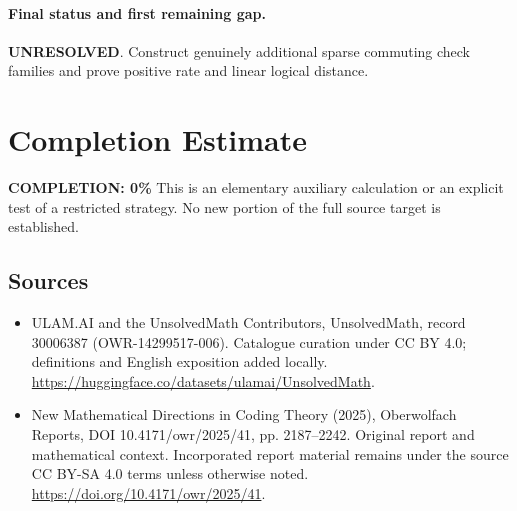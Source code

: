 \documentclass[11pt]{article}
\begin{document}
\paragraph{Final status and first remaining gap.}
\textbf{UNRESOLVED}. Construct genuinely additional sparse commuting check families and prove positive rate and linear logical distance.

\section{Completion Estimate}
\noindent\textbf{COMPLETION: 0\%}
This is an elementary auxiliary calculation or an explicit test of a restricted strategy. No new portion of the full source target is established.

\subsection{Sources}
\begin{itemize}
\item[\hypertarget{source:30006387:1}{S1}] ULAM.AI and the UnsolvedMath Contributors, UnsolvedMath, record 30006387 (OWR-14299517-006). Catalogue curation under CC BY 4.0; definitions and English exposition added locally.
\url{https://huggingface.co/datasets/ulamai/UnsolvedMath}.
\item[\hypertarget{source:30006387:2}{S2}] New Mathematical Directions in Coding Theory (2025), Oberwolfach Reports, DOI 10.4171/owr/2025/41, pp. 2187--2242. Original report and mathematical context. Incorporated report material remains under the source CC BY-SA 4.0 terms unless otherwise noted.
\url{https://doi.org/10.4171/owr/2025/41}.
\end{itemize}
\label{end:30006387}
\end{document}

